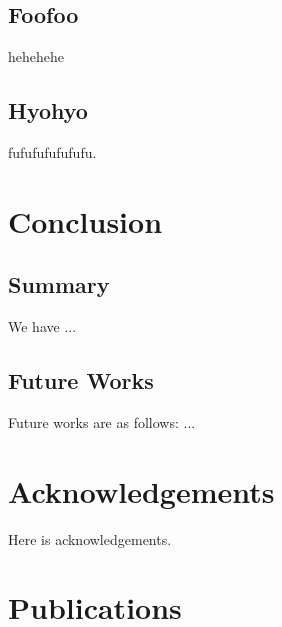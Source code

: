 \documentclass[12pt,dvipdfmx]{report}
\begin{document}
\section{Foofoo}
hehehehe

\section{Hyohyo}

fufufufufufufu.

\chapter{Conclusion}
\section{Summary}

We have ...

\section{Future Works}

Future works are as follows: ...

\newpage

\chapter*{Acknowledgements}
\noindent
Here is acknowledgements.

\newpage


\chapter*{Publications}
\end{document}
